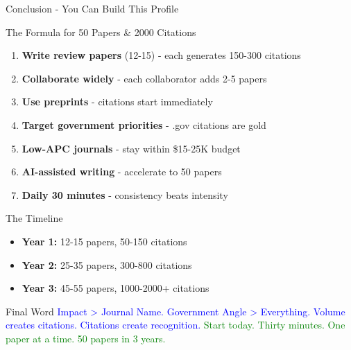 \documentclass[11pt]{beamer}
\begin{document}
	\begin{frame}{Conclusion - You Can Build This Profile}
		\scriptsize
		\begin{block}{The Formula for 50 Papers \& 2000 Citations}
			\begin{enumerate}
				\item \textbf{Write review papers} (12-15) - each generates 150-300 citations
				\item \textbf{Collaborate widely} - each collaborator adds 2-5 papers
				\item \textbf{Use preprints} - citations start immediately
				\item \textbf{Target government priorities} - .gov citations are gold
				\item \textbf{Low-APC journals} - stay within \$15-25K budget
				\item \textbf{AI-assisted writing} - accelerate to 50 papers
				\item \textbf{Daily 30 minutes} - consistency beats intensity
			\end{enumerate}
		\end{block}
		\begin{block}{The Timeline}
			\begin{itemize}
				\item \textbf{Year 1:} 12-15 papers, 50-150 citations
				\item \textbf{Year 2:} 25-35 papers, 300-800 citations
				\item \textbf{Year 3:} 45-55 papers, 1000-2000+ citations
			\end{itemize}
		\end{block}
		\begin{block}{Final Word}
			\textcolor{blue}{Impact > Journal Name. Government Angle > Everything.}
			\textcolor{blue}{Volume creates citations. Citations create recognition.}
			\textcolor{green}{Start today. Thirty minutes. One paper at a time. 50 papers in 3 years.}
		\end{block}
	\end{frame}
	
\end{document}
